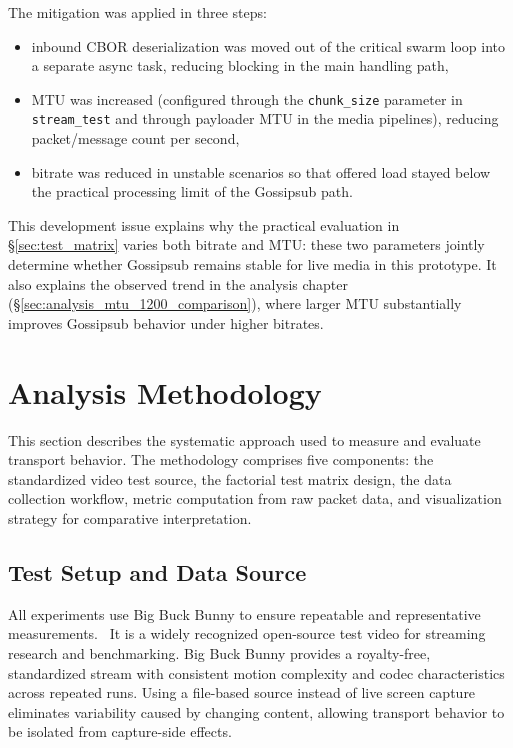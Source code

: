 The mitigation was applied in three steps:
\begin{itemize}
    \item inbound CBOR deserialization was moved out of the critical swarm loop into a separate async task, reducing blocking in the main handling path,
    \item \ac{MTU} was increased (configured through the \texttt{chunk\_size} parameter in \texttt{stream\_test} and through payloader \ac{MTU} in the media pipelines), reducing packet/message count per second,
    \item bitrate was reduced in unstable scenarios so that offered load stayed below the practical processing limit of the Gossipsub path.
\end{itemize}

This development issue explains why the practical evaluation in \S\ref{sec:test_matrix} varies both bitrate and \ac{MTU}: these two parameters jointly determine whether Gossipsub remains stable for live media in this prototype.
It also explains the observed trend in the analysis chapter (\S\ref{sec:analysis_mtu_1200_comparison}), where larger \ac{MTU} substantially improves Gossipsub behavior under higher bitrates.

\section{Analysis Methodology}
This section describes the systematic approach used to measure and evaluate transport behavior. The methodology comprises five components: the standardized video test source, the factorial test matrix design, the data collection workflow, metric computation from raw packet data, and visualization strategy for comparative interpretation.

\subsection{Test Setup and Data Source}
All experiments use Big Buck Bunny to ensure repeatable and representative measurements.~\cite{BigBuckBunny} It is a widely recognized open-source test video for streaming research and benchmarking. Big Buck Bunny provides a royalty-free, standardized stream with consistent motion complexity and codec characteristics across repeated runs. Using a file-based source instead of live screen capture eliminates variability caused by changing content, allowing transport behavior to be isolated from capture-side effects.

